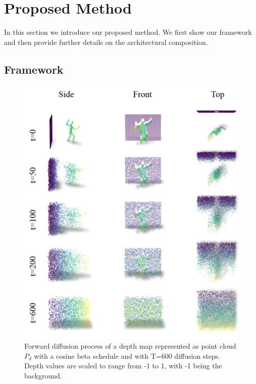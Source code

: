 \section{Proposed Method}\label{sec:proposed_method}
In this section we introduce our proposed method. We first show our framework \modelname{} and then provide further details on the architectural composition.

\subsection{Framework} \label{subsec:Framework}

\begin{figure}[t]
  \centering
  \includegraphics[width=0.99\linewidth]{illustrations/forward_diffusion.png}
  \caption{Forward diffusion process of a depth map represented as point cloud $P_{d}$ with a cosine beta schedule and with T=600 diffusion steps. Depth values are scaled to range from -1 to 1, with -1 being the background.}
  \label{fig:forward_diffusion}
\end{figure}


